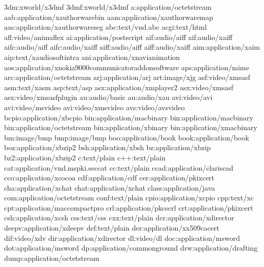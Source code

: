 \documentclass[letterpaper,12pt,english]{sphinxmanual}
\begin{document}
\begin{sphinxVerbatim}[commandchars=\\\{\}]
3dm:x\PYGZhy{}world/x\PYGZhy{}3dmf
3dmf:x\PYGZhy{}world/x\PYGZhy{}3dmf
a:application/octet\PYGZhy{}stream
aab:application/x\PYGZhy{}authorware\PYGZhy{}bin
aam:application/x\PYGZhy{}authorware\PYGZhy{}map
aas:application/x\PYGZhy{}authorware\PYGZhy{}seg
abc:text/vnd.abc
acgi:text/html
afl:video/animaflex
ai:application/postscript
aif:audio/aiff
\PYGZsh{}aif:audio/x\PYGZhy{}aiff
aifc:audio/aiff
\PYGZsh{}aifc:audio/x\PYGZhy{}aiff
aiff:audio/aiff
\PYGZsh{}aiff:audio/x\PYGZhy{}aiff
aim:application/x\PYGZhy{}aim
aip:text/x\PYGZhy{}audiosoft\PYGZhy{}intra
ani:application/x\PYGZhy{}navi\PYGZhy{}animation
aos:application/x\PYGZhy{}nokia\PYGZhy{}9000\PYGZhy{}communicator\PYGZhy{}add\PYGZhy{}on\PYGZhy{}software
aps:application/mime
arc:application/octet\PYGZhy{}stream
arj:application/arj
art:image/x\PYGZhy{}jg
asf:video/x\PYGZhy{}ms\PYGZhy{}asf
asm:text/x\PYGZhy{}asm
asp:text/asp
asx:application/x\PYGZhy{}mplayer2
\PYGZsh{}asx:video/x\PYGZhy{}ms\PYGZhy{}asf
\PYGZsh{}asx:video/x\PYGZhy{}ms\PYGZhy{}asf\PYGZhy{}plugin
au:audio/basic
\PYGZsh{}au:audio/x\PYGZhy{}au
\PYGZsh{}avi:video/avi
\PYGZsh{}avi:video/msvideo
avi:video/x\PYGZhy{}msvideo
avs:video/avs\PYGZhy{}video
bcpio:application/x\PYGZhy{}bcpio
\PYGZsh{}bin:application/mac\PYGZhy{}binary
\PYGZsh{}bin:application/macbinary
\PYGZsh{}bin:application/octet\PYGZhy{}stream
bin:application/x\PYGZhy{}binary
\PYGZsh{}bin:application/x\PYGZhy{}macbinary
bm:image/bmp
bmp:image/bmp
boo:application/book
book:application/book
boz:application/x\PYGZhy{}bzip2
bsh:application/x\PYGZhy{}bsh
bz:application/x\PYGZhy{}bzip
bz2:application/x\PYGZhy{}bzip2
c:text/plain
c++:text/plain
cat:application/vnd.ms\PYGZhy{}pki.seccat
cc:text/plain
ccad:application/clariscad
cco:application/x\PYGZhy{}cocoa
cdf:application/cdf
cer:application/pkix\PYGZhy{}cert
cha:application/x\PYGZhy{}chat
chat:application/x\PYGZhy{}chat
class:application/java
com:application/octet\PYGZhy{}stream
conf:text/plain
cpio:application/x\PYGZhy{}cpio
cpp:text/x\PYGZhy{}c
cpt:application/mac\PYGZhy{}compactpro
crl:application/pkcs\PYGZhy{}crl
crt:application/pkix\PYGZhy{}cert
csh:application/x\PYGZhy{}csh
css:text/css
cxx:text/plain
dcr:application/x\PYGZhy{}director
deepv:application/x\PYGZhy{}deepv
def:text/plain
der:application/x\PYGZhy{}x509\PYGZhy{}ca\PYGZhy{}cert
dif:video/x\PYGZhy{}dv
dir:application/x\PYGZhy{}director
dl:video/dl
doc:application/msword
dot:application/msword
dp:application/commonground
drw:application/drafting
dump:application/octet\PYGZhy{}stream

\end{sphinxVerbatim}
\end{document}
